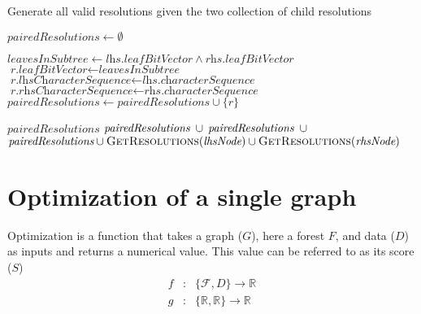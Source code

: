 \documentclass[12pt]{article}
\begin{document}
{\begin{algorithm}
	\caption{Generate all valid resolutions given the two collection of child resolutions}
	\label{Alg:generate-resolutions}
	\begin{algorithmic}[1]
		\State $\textit{pairedResolutions} \gets \emptyset$

		    \State $\textit{leavesInSubtree} \gets \textit{lhs.leafBitVector} \land \textit{rhs.leafBitVector}$
		      \State $\textit{r.leafBitVector} \gets \textit{leavesInSubtree}$
		      \State $\textit{r.lhsCharacterSequence} \gets \textit{lhs.characterSequence}$
		      \State $\textit{r.rhsCharacterSequence} \gets \textit{rhs.characterSequence}$
		      \State $\textit{pairedResolutions} \gets \textit{pairedResolutions} \cup \{r\}$
		    \EndIf    
		  \EndFor
		\EndFor
		
		 \State \Return $\textit{pairedResolutions}$
		\EndCase
		  \State \Return $\textit{pairedResolutions} \hspace{0.5em} \cup$ 
		\EndCase
		  \State \Return $\textit{pairedResolutions} \hspace{0.5em} \cup$ 
		\EndCase
		  \State \Return $\textit{pairedResolutions}\cup\Call{GetResolutions}{\textit{lhsNode}} \cup \Call{GetResolutions}{\textit{rhsNode}}$
		\EndCase
		\EndSwitch
		\EndFunction
	\end{algorithmic}
\end{algorithm}
\clearpage
\restoregeometry
}


\section{Optimization of a single graph}\label{Optimization of a single graph}

Optimization is a function that takes a graph ($G$), here a forest $F$, and data ($D$) as inputs and returns a numerical value.  
This value can be referred to as its score ($S$)
 	\begin{eqnarray*}
 		f & : &  \{\mathcal{F}, D\} \rightarrow \mathbb{R}\\
		g & : & \{  \mathbb{R},  \mathbb{R} \} \rightarrow \mathbb{R}
	 \end{eqnarray*}
 
\end{document}
